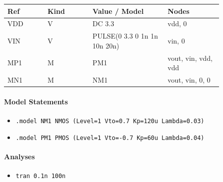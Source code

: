 \begin{longtable}{p{0.16\linewidth}p{0.18\linewidth}p{0.30\linewidth}p{0.22\linewidth}}
\textbf{Ref} & \textbf{Kind} & \textbf{Value / Model} & \textbf{Nodes}\\
\hline
VDD & V & DC 3.3 & vdd, 0\\
VIN & V & PULSE(0 3.3 0 1n 1n 10n 20n) & vin, 0\\
MP1 & M & PM1 & vout, vin, vdd, vdd\\
MN1 & M & NM1 & vout, vin, 0, 0\\
\end{longtable}

\paragraph{Model Statements}
\begin{itemize}
  \item \texttt{.model NM1 NMOS (Level=1 Vto=0.7 Kp=120u Lambda=0.03)}
  \item \texttt{.model PM1 PMOS (Level=1 Vto=-0.7 Kp=60u Lambda=0.04)}
\end{itemize}

\paragraph{Analyses}
\begin{itemize}
  \item \texttt{tran 0.1n 100n}
\end{itemize}

